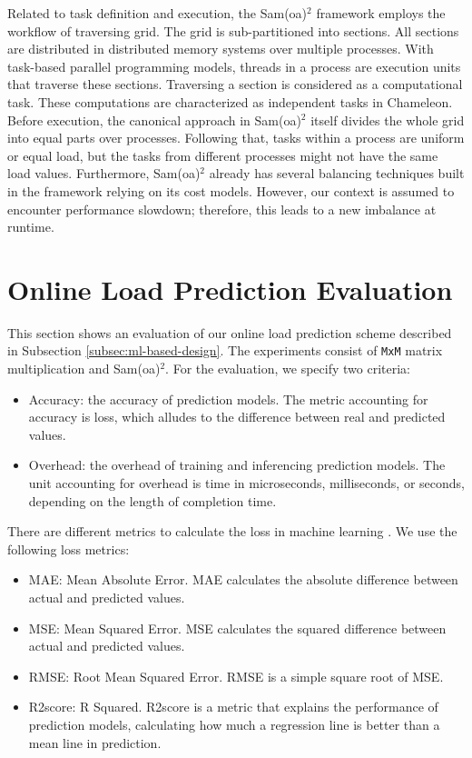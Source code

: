 Related to task definition and execution, the Sam(oa)$^2$ framework employs the workflow of traversing grid. The grid is sub-partitioned into sections. All sections are distributed in distributed memory systems over multiple processes. With task-based parallel programming models, threads in a process are execution units that traverse these sections. Traversing a section is considered as a computational task. These computations are characterized as independent tasks in Chameleon. Before execution, the canonical approach in Sam(oa)$^2$ itself divides the whole grid into equal parts over processes. Following that, tasks within a process are uniform or equal load, but the tasks from different processes might not have the same load values. Furthermore, Sam(oa)$^2$ already has several balancing techniques built in the framework relying on its cost models. However, our context is assumed to encounter performance slowdown; therefore, this leads to a new imbalance at runtime.

\section{Online Load Prediction Evaluation} \label{sec:online_prediction_evaluation}

This section shows an evaluation of our online load prediction scheme described in Subsection \ref{subsec:ml-based-design}. The experiments consist of \texttt{MxM} matrix multiplication and Sam(oa)$^2$. For the evaluation, we specify two criteria:
\begin{itemize}
	\item Accuracy: the accuracy of prediction models. The metric accounting for accuracy is loss, which alludes to the difference between real and predicted values.
	\item Overhead: the overhead of training and inferencing prediction models. The unit accounting for overhead is time in microseconds, milliseconds, or seconds, depending on the length of completion time.
\end{itemize}

There are different metrics to calculate the loss in machine learning \cite{naser2021errormetricsml}. We use the following loss metrics:
\begin{itemize}
	\item MAE: Mean Absolute Error. MAE calculates the absolute difference between actual and predicted values.
	\item MSE: Mean Squared Error. MSE calculates the squared difference between actual and predicted values.
	\item RMSE: Root Mean Squared Error. RMSE is a simple square root of MSE.
	\item R2score: R Squared. R2score is a metric that explains the performance of prediction models, calculating how much a regression line is better than a mean line in prediction.
\end{itemize}

